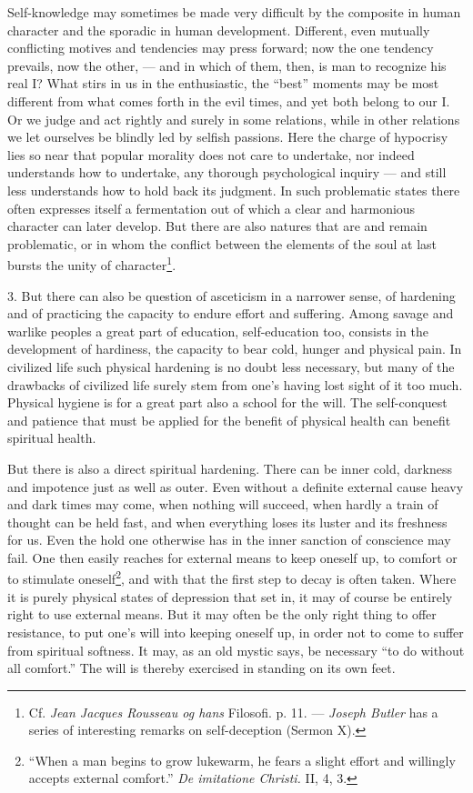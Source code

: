\documentclass[12pt,a4paper,openany]{book}
\newcommand{\opage}[1]{\marginnote{\footnotesize\textit{[#1]}}}
\begin{document}
Self-knowledge may sometimes be made very difficult by the composite in human character and the sporadic in
human development. Different, even mutually conflicting motives and tendencies may press forward; now the one
tendency prevails, now the other, --- and in which of them, then, is man to recognize his real I? What stirs in
us in the enthusiastic, the ``best'' moments may be most different from what comes forth in the evil times, and
yet both belong to our I. Or we judge and act rightly and surely in some relations, while in other relations we
let ourselves be blindly led by selfish passions. Here the charge of hypocrisy lies so near that popular morality
does not care to undertake, nor indeed understands how to undertake, any thorough psychological inquiry --- and
still less understands how to hold back its judgment. In such problematic states there often expresses itself a
fermentation out of which a clear and harmonious character can later develop. But there are also natures that are
and remain problematic, or in whom
\opage{196}the conflict between the elements of the soul at last bursts the unity of character\footnote[1]{Cf.
\textit{Jean Jacques Rousseau og hans} Filosofi. p. 11. --- \emph{Joseph Butler} has a series of interesting
remarks on self-deception (Sermon X).}.

3. But there can also be question of asceticism in a narrower sense, of hardening and of practicing the capacity
to endure effort and suffering. Among savage and warlike peoples a great part of education, self-education too,
consists in the development of hardiness, the capacity to bear cold, hunger and physical pain. In civilized life
such physical hardening is no doubt less necessary, but many of the drawbacks of civilized life surely stem from
one's having lost sight of it too much. Physical hygiene is for a great part also a school for the will. The
self-conquest and patience that must be applied for the benefit of physical health can benefit spiritual health.

But there is also a direct spiritual hardening. There can be inner cold, darkness and impotence just as well as
outer. Even without a definite external cause heavy and dark times may come, when nothing will succeed, when
hardly a train of thought can be held fast, and when everything loses its luster and its freshness for us. Even
the hold one otherwise has in the inner sanction of conscience may fail. One then easily reaches for external
means to keep oneself up, to comfort or to stimulate oneself\footnote[2]{``When a man begins to grow lukewarm, he
fears a slight effort and willingly accepts external comfort.'' \textit{De imitatione Christi.} II, 4, 3.}, and
with that the first step to decay is often taken. Where it is purely physical states of depression that set in,
it may of course be entirely right to use external means. But it may often be the only right thing to offer
resistance, to put one's will into keeping oneself up, in order not to come to suffer from spiritual softness. It
may, as an old mystic says, be necessary ``to do without all comfort.'' The will is thereby exercised in standing
on its own feet.
\end{document}
